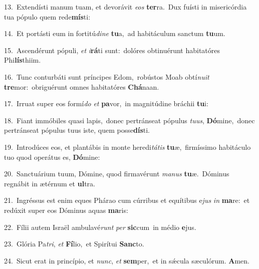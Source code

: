 {\numbfont\textcolor{\numbcolor}{13.}}~Extendísti manum tuam, et devorávit \textit{e}\-\textit{os} \textbf{ter}\-ra.~\star Dux fuísti in misericórdia tua pópulo quem rede\-\textbf{mís}\-ti:\par
{\numbfont\textcolor{\numbcolor}{14.}}~Et portásti eum in fortitú\-\textit{di}\-\textit{ne} \textbf{tu}\-a,~\star ad habitáculum sanctum \textbf{tu}\-um.\par
{\numbfont\textcolor{\numbcolor}{15.}}~Ascendérunt pópuli, \textit{et} \textit{i}\-\textbf{rá}ti sunt:~\star dolóres obtinuérunt habitatóres Phi\-\textbf{lís}\-thiim.\par
{\numbfont\textcolor{\numbcolor}{16.}}~Tunc conturbáti sunt príncipes Edom,~\dagger robústos Moab obtí\-\textit{nu}\-\textit{it} \textbf{tre}\-mor:~\star obriguérunt omnes habitatóres \textbf{Chá}\-naan.\par
{\numbfont\textcolor{\numbcolor}{17.}}~Irruat super eos formí\textit{do} \textit{et} \textbf{pa}\-vor,~\star in magnitúdine bráchii \textbf{tu}\-i:\par
{\numbfont\textcolor{\numbcolor}{18.}}~Fiant immóbiles quasi lapis,~\dagger donec pertránseat pópulus \textit{tu}\-\textit{us}, \textbf{Dó}\-mine,~\star donec pertránseat pópulus tuus iste, quem posse\-\textbf{dís}\-ti.\par
{\numbfont\textcolor{\numbcolor}{19.}}~Introdúces eos, et plantábis in monte heredi\-\textit{tá}\-\textit{tis} \textbf{tu}\-æ,~\star firmíssimo habitáculo tuo quod operátus es, \textbf{Dó}\-mine:\par
{\numbfont\textcolor{\numbcolor}{20.}}~Sanctuárium tuum, Dómine, quod firmavérunt \textit{ma}\-\textit{nus} \textbf{tu}\-æ.~\star Dóminus regnábit in ætérnum et \textbf{ul}\-tra.\par
{\numbfont\textcolor{\numbcolor}{21.}}~Ingréssus est enim eques Phárao cum cúrribus et equítibus e\textit{jus} \textit{in} \textbf{ma}\-re:~\star et redúxit super eos Dóminus aquas \textbf{ma}\-ris:\par
{\numbfont\textcolor{\numbcolor}{22.}}~Fílii autem Israël ambulavé\textit{runt} \textit{per} \textbf{sic}\-cum~\star in médio \textbf{e}\-jus.\par
{\numbfont\textcolor{\numbcolor}{23.}}~Glória Pa\-\textit{tri}\-, \textit{et} \textbf{Fí}\-lio,~\star et Spirítui \textbf{Sanc}\-to.\par
{\numbfont\textcolor{\numbcolor}{24.}}~Sicut erat in princípio, et \textit{nunc}\-, \textit{et} \textbf{sem}\-per,~\star et in sǽcula sæculórum. \textbf{A}\-men.\par
